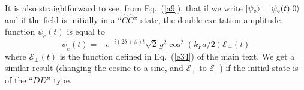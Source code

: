 \documentclass[aps,pra,twocolumn,floatfix,superscriptaddress]{revtex4}
\begin{document}
It is also straightforward to see, from Eq.~(\ref{a9}), that if we write $|\psi_e\rangle = \psi_e(t)|0\rangle$ and if the field is initially in a ``$\hat C \hat C$'' state, the double excitation amplitude function $\psi_e(t)$ is equal to
\begin{equation}
\psi_e(t) = -e^{-i(2\delta + \beta)t} \sqrt 2\, g^2\cos^2(k_F a/2) \mathcal{E}_+(t)
\label{a10}
\end{equation}
where $\mathcal{E}_\pm(t)$ is the function defined in Eq.~(\ref{e34}) of the main text. We get a similar result (changing the cosine to a sine, and $\mathcal{E}_+$ to $\mathcal{E}_-$) if the initial state is of the ``$DD$'' type.



 



\begin{thebibliography}{5}


\end{thebibliography}
\end{document}
